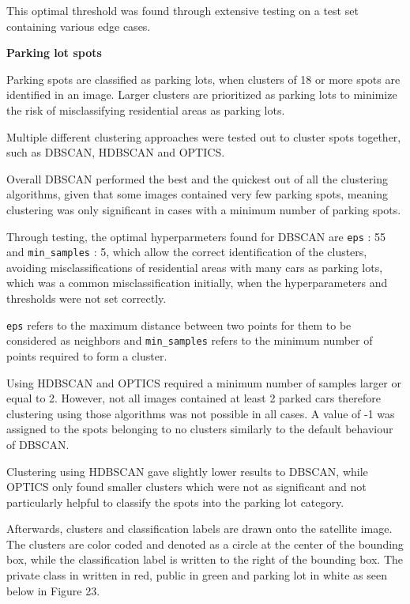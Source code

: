 This optimal threshold was found through extensive testing on a test
set containing various edge cases.

\hspace{2em}\textbf{Parking lot spots}

Parking spots are classified as parking lots, when clusters of 18 or more spots
are identified in an image. Larger clusters are prioritized as parking lots to
minimize the risk of misclassifying residential areas as parking lots.

Multiple different clustering approaches were tested out to cluster spots
together, such as DBSCAN, HDBSCAN and OPTICS.

Overall DBSCAN performed the best and the quickest out of all the clustering
algorithms, given that some images contained very few parking spots, meaning
clustering was only significant in cases with a minimum number of parking spots.

Through testing, the optimal hyperparmeters found for DBSCAN are \texttt{eps} :
55 and \texttt{min\_samples} : 5, which allow the correct identification of the
clusters, avoiding misclassifications of residential areas with many cars as
parking lots, which was a common misclassification initially, when the
hyperparameters and thresholds were not set correctly.

\texttt{eps} refers to the maximum distance between two points for them to be
considered as neighbors and \texttt{min\_samples} refers to the minimum number
of points required to form a cluster.

Using HDBSCAN and OPTICS required a minimum number of samples larger or equal to
2. However, not all images contained at least 2 parked cars therefore clustering using
those algorithms was not possible in all cases. A value of -1 was assigned to the
spots belonging to no clusters similarly to the default behaviour of DBSCAN.

Clustering using HDBSCAN gave slightly lower results to DBSCAN, while OPTICS
only found smaller clusters which were not as significant and not particularly
helpful to classify the spots into the parking lot category.

Afterwards, clusters and classification labels are drawn onto the satellite
image. The clusters are color coded and denoted as a circle at the center of the
bounding box, while the classification label is written to the right of the
bounding box. The private class in written in red, public in green and parking
lot in white as seen below in Figure 23.

